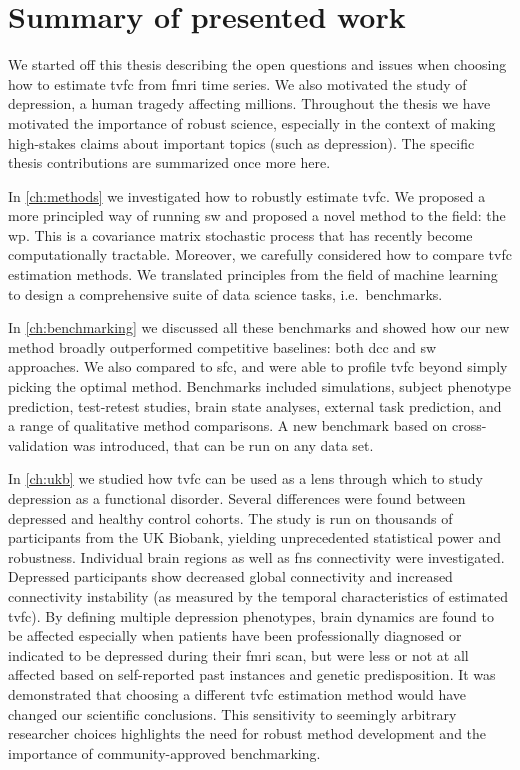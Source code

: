 \clearpage
\section{Summary of presented work}

We started off this thesis describing the open questions and issues when choosing how to estimate \gls{tvfc} from \gls{fmri} time series.
We also motivated the study of depression, a human tragedy affecting millions.
Throughout the thesis we have motivated the importance of robust science, especially in the context of making high-stakes claims about important topics (such as depression).
The specific thesis contributions are summarized once more here.

In \cref{ch:methods} we investigated how to robustly estimate \gls{tvfc}.
We proposed a more principled way of running \gls{sw} and proposed a novel method to the field: the \gls{wp}.
This is a covariance matrix stochastic process that has recently become computationally tractable.
Moreover, we carefully considered how to compare \gls{tvfc} estimation methods.
We translated principles from the field of machine learning to design a comprehensive suite of data science tasks, i.e.~benchmarks.

In \cref{ch:benchmarking} we discussed all these benchmarks and showed how our new method broadly outperformed competitive baselines: both \gls{dcc} and \gls{sw} approaches.
We also compared to \gls{sfc}, and were able to profile \gls{tvfc} beyond simply picking the optimal method.
Benchmarks included simulations, subject phenotype prediction, test-retest studies, brain state analyses, external task prediction, and a range of qualitative method comparisons.
A new benchmark based on cross-validation was introduced, that can be run on any data set.

In \cref{ch:ukb} we studied how \gls{tvfc} can be used as a lens through which to study depression as a functional disorder.
Several differences were found between depressed and healthy control cohorts.
The study is run on thousands of participants from the UK Biobank, yielding unprecedented statistical power and robustness.
Individual brain regions as well as \glspl{fn} connectivity were investigated.
Depressed participants show decreased global connectivity and increased connectivity instability (as measured by the temporal characteristics of estimated \gls{tvfc}).
By defining multiple depression phenotypes, brain dynamics are found to be affected especially when patients have been professionally diagnosed or indicated to be depressed during their \gls{fmri} scan, but were less or not at all affected based on self-reported past instances and genetic predisposition.
It was demonstrated that choosing a different \gls{tvfc} estimation method would have changed our scientific conclusions.
This sensitivity to seemingly arbitrary researcher choices highlights the need for robust method development and the importance of community-approved benchmarking.
